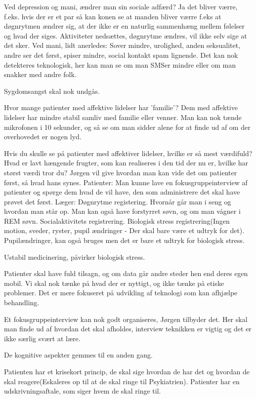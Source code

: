 Ved depression og mani, ændrer man sin sociale adfærd? Ja det bliver værre, f.eks. hvis der er et par så kan konen se at manden bliver værre f.eks at døgnrytmen ændrer sig, at der ikke er en naturlig sammenhæng mellem følelser og hvad der siges. Aktiviteter nedsættes, døgnrytme ændres, vil ikke selv sige at det sker. Ved mani, lidt anerledes: Sover mindre, urolighed, anden seksualitet, andre ser det først, spiser mindre, social kontakt spam lignende. Det kan nok detekteres teknologisk, her kan man se om man SMSer mindre eller om man snakker med andre folk. 

Sygdomsangst skal nok undgås. 

Hvor mange patienter med affektive lidelser har 'familie'? Dem med affektive lidelser har mindre stabil samliv med familie eller venner. 
Man kan nok tænde mikrofonen i 10 sekunder, og så se om man sidder alene for at finde ud af om der overhovedet er nogen lyd.

Hvis du skulle se på patienter med affektiver lidelser, hvilke er så mest værdifuld? Hvad er lavt hængende frugter, som kan realiseres i den tid der nu er, hvilke har størst værdi tror du? Jørgen vil give hvordan man kan vide det om patienter først, så hvad hans synes.
Patienter: Man kunne lave en fokusgruppeinterview af patienter og spørge dem hvad de vil have, den som administrere det skal have prøvet det først.
Læger: Døgnrytme registering. Hvornår går man i seng og hvordan man står op. Man kan også have forstyrret søvn, og om man vågner i REM søvn.
Socialaktivitets registrering.
Biologisk stress registrering(Ingen motion, sveder, ryster, pupil ændringer - Der skal bare være et udtryk for det). Pupilændringer, kan også bruges men det er bare et udtryk for biologisk stress.

Ustabil medicinering, påvirker biologisk stress. 

Patienter skal have fuld tilsagn, og om data går andre steder hen end deres egen mobil. Vi skal nok tænke på hvad der er nyttigt, og ikke tænke på etiske problemer. Det er mere fokuseret på udvikling af teknologi som kan afhjælpe behandling.

Et fokusgruppeinterview kan nok godt organiseres, Jørgen tilbyder det. Her skal man finde ud af hvordan det skal afholdes, interview teknikken er vigtig og det er ikke særlig svært at lære.

De kognitive aspekter gemmes til en anden gang. 

Patienten har et krisekort princip, de skal sige hvordan de har det og hvordan de skal reagere(Eskaleres op til at de skal ringe til Psykiatrien). Patienter har en udskrivningsaftale, som siger hvem de skal ringe til. 

